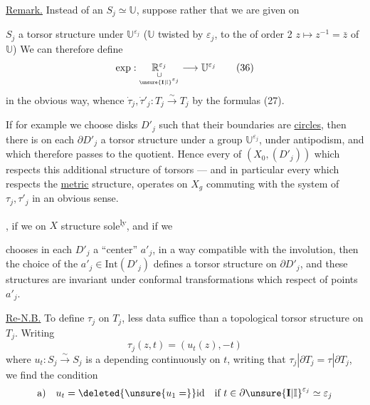 \uline{Remark.} Instead of an  $S_j\simeq\mathbb U$,
suppose rather that we are given on


$S_j$ a torsor structure under $\mathbb U^{\varepsilon_j}$
($\mathbb U$ twisted by $\varepsilon_j$,  to the  of order 2
$z\longmapsto z^{-1}=\bar z$ of $\mathbb U$) We can therefore define
\[
\exp:\underset{\underset{\unsure{\mathbf I|\mathbb I}^{\varepsilon_j}}{\cup}}{\mathbb R^{\varepsilon_j}}
\longrightarrow\mathbb U^{\varepsilon_j}
\tag{36}
\]
in the obvious way, whence 
$\dot\tau_j,\dot\tau'_j:T_j\xrightarrow{\sim}T_j$ by the formulas (27).

If for example we choose disks $D'_j$ such that their boundaries are 
\uline{circles}, then there is on each  $\partial D'_j$
a torsor structure under a group $\mathbb U^{\varepsilon_j}$,
 under antipodism, and which therefore passes to the quotient.
Hence every  of $(X_0,(D'_j))$ which respects this
additional structure of torsors --- and in particular every  which respects
the \uline{metric} structure,  operates on $X_g$ commuting
with the system of $\tau_j,\tau'_j$ in an obvious sense.

, if we   on $X$
 \uline{} structure sole\textsuperscript{ly}, and if we


chooses in each $D'_j$ a ``center'' $a'_j$, in a way compatible with the involution,
then the choice of the $a'_j\in\mathrm{Int}(D'_j)$ defines a torsor structure on
$\partial D'_j$\unsure{\textsuperscript{*}}, and these structures are invariant under
conformal transformations which respect  of points $a'_j$.


\uline{Re-N.B.} To define $\tau_j$ on $T_j$, 
less data suffice than a topological torsor structure on $T_j$.
Writing 
\[
\tau_j(z,t)=(u_t(z),-t)
\tag{37}
\]
where $u_t:S_j\xrightarrow{\sim}S_j$ is a  depending continuously on $t$,
writing that $\tau_j|\partial T_j=\tau|\partial T_j$, we find the condition
\[
\text{a)}\quad u_t=\deleted{\unsure{u_1=}}\mathrm{id}
\quad\text{if }t\in\partial\unsure{\mathbf I|\mathbb I}^{\varepsilon_j}\simeq\varepsilon_j
\]

